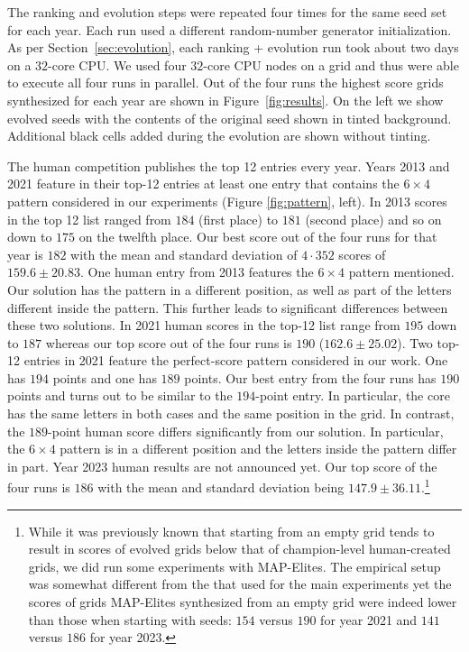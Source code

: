 The ranking and evolution steps were repeated four times for the same seed set for each year. Each run used a different random-number generator initialization. As per Section~\ref{sec:evolution}, each ranking + evolution run took about two days on a $32$-core CPU. We used four $32$-core CPU nodes on a grid and thus were able to execute all four runs in parallel. Out of the four runs the highest score grids synthesized for each year are shown in Figure~\ref{fig:results}. On the left we show evolved seeds with the contents of the original seed shown in tinted background. Additional black cells added during the evolution are shown without tinting.

The human competition publishes the top 12 entries every year. Years 2013 and 2021 feature in their top-12 entries at least one entry that contains the $6 \times 4$ pattern considered in our experiments (Figure \ref{fig:pattern}, left). In 2013 scores in the top 12 list ranged from $184$ (first place) to $181$ (second place) and so on down to $175$ on the twelfth place. Our best score out of the four runs for that year is $182$ with the mean and standard deviation of $4 \cdot 352$ scores of $159.6  \pm 20.83$. 
One human entry from 2013 features the $6 \times 4$ pattern mentioned. 
Our solution has the pattern in a different position, as well as part of the letters different inside the pattern.
This further leads to significant differences between these two solutions.
In 2021 human scores in the top-12 list range from $195$ down to $187$ whereas our top score out of the four runs is $190$ ($162.6 \pm 25.02$). Two top-12 entries in 2021 feature the perfect-score pattern considered in our work. One has $194$ points and one has $189$ points. Our best entry from the four runs has $190$ points and turns out to be similar to the $194$-point entry. In particular, the core has the same letters in both cases and the same position in the grid. In contrast, the $189$-point human score differs significantly from our solution. In particular, the $6 \times 4$ pattern is in a different position and the letters inside the pattern differ in part. Year 2023 human results are not announced yet. Our top score of the four runs is $186$ with the mean and standard deviation being $147.9 \pm 36.11$.\footnote{While it was previously known that starting from an empty grid tends to result in scores of evolved grids below that of champion-level human-created grids, we did run some experiments with MAP-Elites. The empirical setup was somewhat different from the that used for the main experiments yet the scores of grids MAP-Elites synthesized from an empty grid were indeed lower than those when starting with seeds: $154$ versus $190$ for year 2021 and $141$ versus $186$ for year 2023.}

